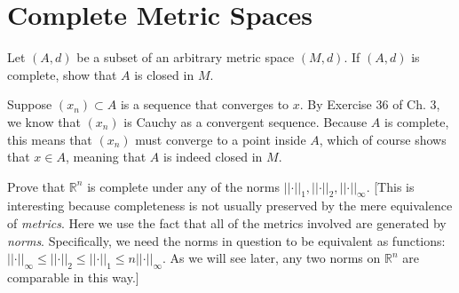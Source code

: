 \section{Complete Metric Spaces}

\begin{exercise}{12}
    Let $(A, d)$ be a subset of an arbitrary metric space \((M, d)\).
    If \((A, d)\) is complete, show that \(A\) is closed in \(M\).
\end{exercise}

\begin{solution}
    
    Suppose $(x_n) \subset A$ is a sequence that converges to $x$.
    By Exercise 36 of Ch. 3, we know that $(x_n)$ is Cauchy as a convergent sequence.
    Because $A$ is complete, this means that $(x_n)$ must converge to a point inside $A$, which of course shows that $x \in A$, meaning that $A$ is indeed closed in $M$.
\end{solution}

\begin{exercise}{16}
    Prove that $\mathbb{R}^n$ is complete under any of the norms $\lvert \lvert \cdot \rvert \rvert_1, \lvert \lvert \cdot \rvert \rvert_2, \lvert \lvert \cdot \rvert \rvert_{\infty}$.
    [This is interesting because completeness is not usually preserved by the mere equivalence of \textit{metrics}.
    Here we use the fact that all of the metrics involved are generated by \textit{norms}.
    Specifically, we need the norms in question to be equivalent as functions: $\lvert \lvert \cdot \rvert \rvert_{\infty} \leq \lvert \lvert \cdot \rvert \rvert_2 \leq \lvert \lvert \cdot \rvert \rvert_1 \leq n \lvert \lvert \cdot \rvert \rvert_{\infty}$.
    As we will see later, any two norms on $\mathbb{R}^n$ are comparable in this way.]
\end{exercise}

